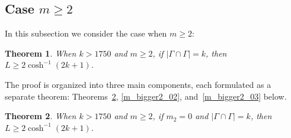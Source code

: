 \documentclass[11pt, a4paper]{article}
\newtheorem{thm}{Theorem}[section]
\theoremstyle{definition}
\theoremstyle{remark}
\newcommand{\abs}[1]{\left| #1 \right|}
\begin{document}
\subsection{Case $m\geqslant2$}


In this subsection we consider the case when $m\geqslant2$:

\begin{thm}\label{m_bigger2} 
 When $k>1750$ and $m\geqslant2$, if $\abs{\Gamma\cap\Gamma}=k$, then $L\geqslant2\cosh^{-1}(2k+1)$. 
\end{thm}

The proof is organized into three main components, each formulated as a separate theorem: Theorems~\ref{m_bigger2_01}, \ref{m_bigger2_02}, and~\ref{m_bigger2_03} below.








\begin{thm}\label{m_bigger2_01} 
 When $k>1750$ and $m\geqslant2$, if $m_2=0$ and $\abs{\Gamma\cap\Gamma}=k$, then $L\geqslant2\cosh^{-1}(2k+1)$. 
\end{thm}
\end{document}
